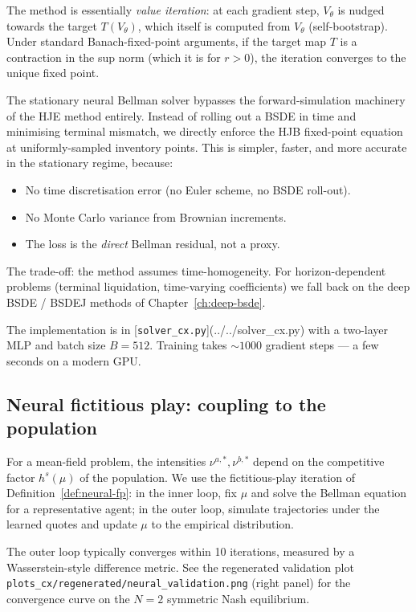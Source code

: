 The method is essentially \emph{value iteration}: at each gradient step, $V_\theta$ is nudged towards the target $T(V_\theta)$, which itself is computed from $V_\theta$ (self-bootstrap). Under standard Banach-fixed-point arguments, if the target map $T$ is a contraction in the sup norm (which it is for $r > 0$), the iteration converges to the unique fixed point.

\begin{intuition}
The stationary neural Bellman solver bypasses the forward-simulation machinery of the HJE method entirely. Instead of rolling out a BSDE in time and minimising terminal mismatch, we directly enforce the HJB fixed-point equation at uniformly-sampled inventory points. This is simpler, faster, and more accurate in the stationary regime, because:
\begin{itemize}
  \item No time discretisation error (no Euler scheme, no BSDE roll-out).
  \item No Monte Carlo variance from Brownian increments.
  \item The loss is the \emph{direct} Bellman residual, not a proxy.
\end{itemize}
The trade-off: the method assumes time-homogeneity. For horizon-dependent problems (terminal liquidation, time-varying coefficients) we fall back on the deep BSDE / BSDEJ methods of Chapter~\ref{ch:deep-bsde}.
\end{intuition}

The implementation is in [\texttt{solver\_cx.py}](../../solver_cx.py) with a two-layer MLP and batch size $B = 512$. Training takes $\sim 1000$ gradient steps --- a few seconds on a modern GPU.

\subsection{Neural fictitious play: coupling to the population}

For a mean-field problem, the intensities $\nu^{a,*}, \nu^{b,*}$ depend on the competitive factor $h^s(\mu)$ of the population. We use the fictitious-play iteration of Definition~\ref{def:neural-fp}: in the inner loop, fix $\mu$ and solve the Bellman equation for a representative agent; in the outer loop, simulate trajectories under the learned quotes and update $\mu$ to the empirical distribution.

The outer loop typically converges within 10 iterations, measured by a Wasserstein-style difference metric. See the regenerated validation plot \texttt{plots\_cx/regenerated/neural\_validation.png} (right panel) for the convergence curve on the $N = 2$ symmetric Nash equilibrium.

